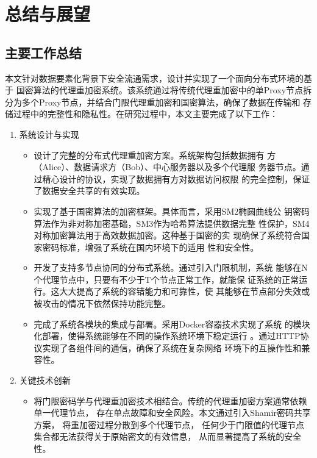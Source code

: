 \chapter{总结与展望}
\section{主要工作总结}

本文针对数据要素化背景下安全流通需求，设计并实现了一个面向分布式环境的基于
国密算法的代理重加密系统。该系统通过将传统代理重加密中的单Proxy节点拆
分为多个Proxy节点，并结合门限代理重加密和国密算法，确保了数据在传输和
存储过程中的完整性和隐私性。在研究过程中，本文主要完成了以下工作：

\begin{enumerate}
	\item 系统设计与实现
	      \begin{itemize}
		      \item 设计了完整的分布式代理重加密方案。系统架构包括数据拥有
		            方（Alice）、数据请求方（Bob）、中心服务器以及多个代理服
		            务器节点。通过精心设计的协议，实现了数据拥有方对数据访问权限
		            的完全控制，保证了数据安全共享的有效实现。

		      \item 实现了基于国密算法的加密框架。具体而言，采用SM2椭圆曲线公
		            钥密码算法作为非对称加密基础，SM3作为哈希算法提供数据完整
		            性保护，SM4对称加密算法用于高效数据加密。这种基于国密的实
		            现确保了系统符合国家密码标准，增强了系统在国内环境下的适用
		            性和安全性。

		      \item 开发了支持多节点协同的分布式系统。通过引入门限机制，系统
		            能够在N个代理节点中，只要有不少于T个节点正常工作，就能保
		            证系统的正常运行。这大大提高了系统的容错能力和可靠性，使
		            其能够在节点部分失效或被攻击的情况下依然保持功能完整。

		      \item 完成了系统各模块的集成与部署。采用Docker容器技术实现了系统
		            的模块化部署，使得系统能够在不同的操作系统环境下稳定运行
		            。通过HTTP协议实现了各组件间的通信，确保了系统在复杂网络
		            环境下的互操作性和兼容性。
	      \end{itemize}

	\item 关键技术创新
	      \begin{itemize}
		      \item 将门限密码学与代理重加密技术相结合。传统的代理重加密方案通常依赖单一代理节点，
		            存在单点故障和安全风险。本文通过引入Shamir密码共享方案，
		            将重加密过程分散到多个代理节点，
		            任何少于门限值的代理节点集合都无法获得关于原始密文的有效信息，
		            从而显著提高了系统的安全性。


\end{itemize}
\end{enumerate}
